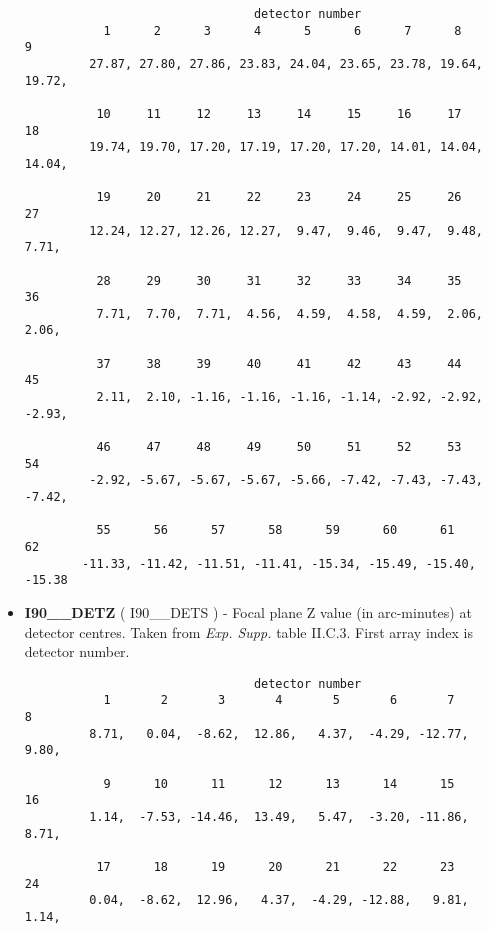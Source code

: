 \begin{itemize}
\begin{minipage}[t]{\textwidth}
\small
\begin{verbatim}
                                detector number
           1      2      3      4      5      6      7      8      9
         27.87, 27.80, 27.86, 23.83, 24.04, 23.65, 23.78, 19.64, 19.72,

          10     11     12     13     14     15     16     17     18
         19.74, 19.70, 17.20, 17.19, 17.20, 17.20, 14.01, 14.04, 14.04,

          19     20     21     22     23     24     25     26     27
         12.24, 12.27, 12.26, 12.27,  9.47,  9.46,  9.47,  9.48,  7.71,

          28     29     30     31     32     33     34     35     36
          7.71,  7.70,  7.71,  4.56,  4.59,  4.58,  4.59,  2.06,  2.06,

          37     38     39     40     41     42     43     44     45
          2.11,  2.10, -1.16, -1.16, -1.16, -1.14, -2.92, -2.92, -2.93,

          46     47     48     49     50     51     52     53     54
         -2.92, -5.67, -5.67, -5.67, -5.66, -7.42, -7.43, -7.43, -7.42,

          55      56      57      58      59      60      61      62
        -11.33, -11.42, -11.51, -11.41, -15.34, -15.49, -15.40, -15.38

\end{verbatim}
\normalsize
\end{minipage}

\item {\bf I90\_\_DETZ} ( I90\_\_DETS ) -    Focal plane Z value (in arc-minutes) at
detector centres. Taken from {\em Exp.  Supp.} table II.C.3. First array index is detector number.

\begin{minipage}[t]{\textwidth}
\small
\begin{verbatim}
                                detector number
           1       2       3       4       5       6       7       8
         8.71,   0.04,  -8.62,  12.86,   4.37,  -4.29, -12.77,   9.80,

           9      10      11      12      13      14      15      16
         1.14,  -7.53, -14.46,  13.49,   5.47,  -3.20, -11.86,   8.71,

          17      18      19      20      21      22      23      24
         0.04,  -8.62,  12.96,   4.37,  -4.29, -12.88,   9.81,   1.14,


\end{verbatim}
\end{minipage}
\end{itemize}
